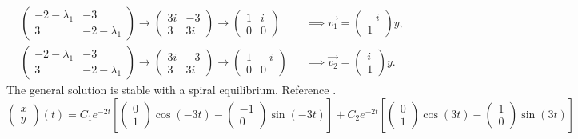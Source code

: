 \documentclass[12pt]{article}
\begin{document}
\begin{equation*}
  \begin{aligned}
    &\begin{pmatrix}-2-\lambda_1&-3\\3&-2-\lambda_1\end{pmatrix}
    \rightarrow\begin{pmatrix}3i&-3\\3&3i\end{pmatrix}
    \rightarrow\begin{pmatrix}1&i\\0&0\end{pmatrix}
    &&\implies \vec{v_1} = \begin{pmatrix}-i\\1\end{pmatrix}y, \\
    &\begin{pmatrix}-2-\lambda_1&-3\\3&-2-\lambda_1\end{pmatrix}
    \rightarrow\begin{pmatrix}3i&-3\\3&3i\end{pmatrix}
    \rightarrow\begin{pmatrix}1&-i\\0&0\end{pmatrix}
    &&\implies \vec{v_2} = \begin{pmatrix}i\\1\end{pmatrix}y.
  \end{aligned}
\end{equation*}
The general solution is stable with a spiral equilibrium. Reference \todo[figure].
$$\boxed{\begin{pmatrix}x\\y\end{pmatrix}(t)=C_1e^{-2t}\left[\begin{pmatrix}0\\1\end{pmatrix}\cos(-3t)
  -\begin{pmatrix}-1\\0\end{pmatrix}\sin(-3t)\right]+
C_2e^{-2t}\left[\begin{pmatrix}0\\1\end{pmatrix}\cos(3t)
  -\begin{pmatrix}1\\0\end{pmatrix}\sin(3t)\right]}
$$
\newpage
\end{document}
